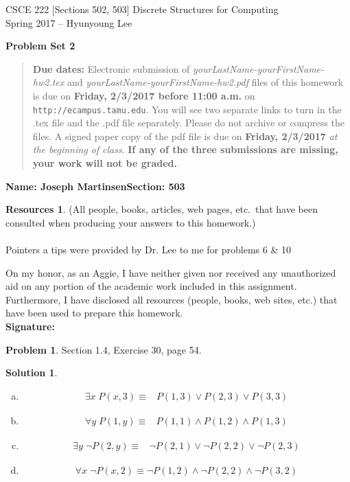 \documentclass{article}
\theoremstyle{definition}
\newtheorem{problem}{Problem}
\newtheorem*{solution}{Solution}
\newtheorem*{resources}{Resources}
\newcommand{\name}[2]{\noindent\textbf{Name: #1}\hfill \textbf{Section: #2}}
\newcommand{\honor}{\noindent On my honor, as an Aggie, I have neither
  given nor received any unauthorized aid on any portion of the
  academic work included in this assignment. Furthermore, I have
  disclosed all resources (people, books, web sites, etc.) that have
  been used to prepare this homework. \\[2ex]
 \textbf{Signature:} \underline{\hspace*{10cm}} }
\newcommand{\problemset}[1]{\begin{center}\textbf{Problem Set #1}\end{center}}
\newcommand{\duedate}[2]{\begin{quote}\textbf{Due dates:} Electronic
    submission of \textsl{yourLastName-yourFirstName-hw2.tex} and 
    \textsl{yourLastName-yourFirstName-hw2.pdf} files of this homework is due on
    \textbf{#1} on \texttt{http://ecampus.tamu.edu}. You will see two separate links
    to turn in the .tex file and the .pdf file separately. Please do not archive or compress the files.  
    A signed paper copy of the pdf file is due on \textbf{#2} \textsl{at the beginning of class}.
    \textbf{If any of the three submissions are missing, your work will not be graded.}\end{quote} }
\begin{document}
\vspace*{-15mm}
\begin{center}
{\large
CSCE 222 [Sections 502, 503] Discrete Structures for Computing\\[.5ex]
Spring 2017 -- Hyunyoung Lee\\}
\end{center}
\problemset{2}
\duedate{Friday, 2/3/2017 before 11:00 a.m.}{Friday, 2/3/2017}
\name{Joseph Martinsen}{503}
\begin{resources} (All people, books, articles, web pages, etc.\ that
  have been consulted when producing your answers to this homework.) \\ \ \\
  Pointers a tips were provided by Dr. Lee to me for problems 6 \& 10
\end{resources}
\honor

\smallskip

\begin{problem} Section 1.4, Exercise 30, page 54. 
\end{problem}
\begin{solution}
\begin{enumerate}[a)]
  \ \\ $x \in \{1,2,3 \} \quad y \in \{1,2,3\}$
  \item
  \begin{align*}
    \exists x \; P(x,3) \equiv& P(1,3) \lor P(2,3) \lor P(3,3)
  \end{align*}
  
  \item
  \begin{align*}
    \forall y \; P(1,y) \equiv& P(1,1) \land P(1,2) \land P(1,3)
  \end{align*}
  \item
  \begin{align*}
    \exists y \; \neg P(2,y) \equiv& \neg P(2,1) \lor \neg P(2,2) \lor \neg P(2,3)
  \end{align*}
  \item
  \begin{align*}
    \forall x \; \neg P(x,2) \equiv \neg P(1,2) \land \neg P(2,2) \land \neg P(3,2)
  \end{align*}
\end{enumerate}
\end{solution}
\end{document}
